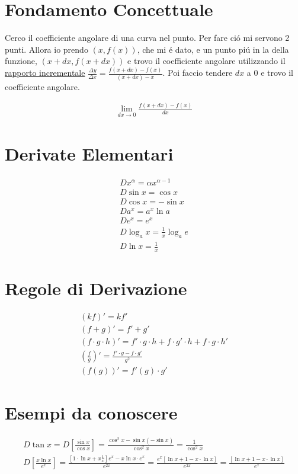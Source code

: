 \documentclass{article}
\title{\jobname}
\author{Eugenio Animali}
\begin{document}
\maketitle
\tableofcontents
\newpage
\section{Fondamento Concettuale}

Cerco il coefficiente angolare di una curva nel punto. Per fare ció mi servono 2 punti. Allora io prendo $(x,f(x))$, che mi é dato, e un punto piú in la della funzione, $(x+dx,f(x+dx))$ e trovo il coefficiente angolare utilizzando il \underline{rapporto incrementale} $\frac{\Delta y}{\Delta x}= \frac{f(x+dx)-f(x)}{(x+dx)-x}$. Poi faccio tendere $dx$ a 0 e trovo il coefficiente angolare.

\begin{gather*}
    \lim_{dx\to 0}\frac{f(x+dx)-f(x)}{dx}
\end{gather*}
\section{Derivate Elementari}
\begin{gather*}
    Dx^\alpha=\alpha x^{\alpha-1}\\
    D\sin x=\cos x\\
    D\cos x=-\sin x\\
    Da^x=a^x\ln a\\
    De^x=e^x\\
    D\log_ax=\frac{1}{x}\log_ae\\
    D\ln x=\frac{1}{x}
\end{gather*}

\section{Regole di Derivazione}
\begin{gather*}
    (kf)'=kf'\\
    (f+g)'=f'+g'\\
    (f\cdot g\cdot h)'=f'\cdot g\cdot h+f\cdot g'\cdot h+f\cdot g\cdot h'\\
    \left(\frac{f}{g}\right)'=\frac{f'\cdot g-f\cdot g'}{g^2}\\
    (f(g))'=f'(g)\cdot g'
\end{gather*}
\section{Esempi da conoscere}
\begin{gather*}
    D\tan x=D\left[\frac{\sin x}{\cos x}\right]=\frac{\cos^2 x - \sin x(-\sin x)}{\cos^2 x}=\frac{1}{\cos^2 x}\\
    D\left[\frac{x\ln x}{e^x}\right]=\frac{\left[1\cdot \ln x+x\frac{1}{x}\right]e^x-x\ln x\cdot e^x}{e^{2x}}= \frac{e^x\left[\ln x+1-x\cdot \ln x\right]}{e^{2x}}= \frac{\left[\ln x+1-x\cdot \ln x\right]}{e^x}
\end{gather*}
\end{document}
